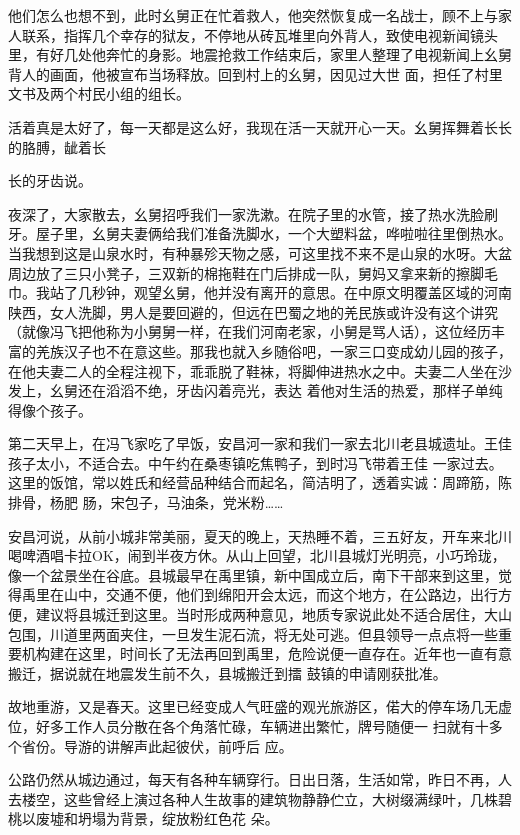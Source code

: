 \documentclass{article}
\begin{document}
他们怎么也想不到，此时幺舅正在忙着救人，他突然恢复成一名战士，顾不上与家人联系，指挥几个幸存的狱友，不停地从砖瓦堆里向外背人，致使电视新闻镜头里，有好几处他奔忙的身影。地震抢救工作结束后，家里人整理了电视新闻上幺舅背人的画面，他被宣布当场释放。回到村上的幺舅，因见过大世
面，担任了村里文书及两个村民小组的组长。 

活着真是太好了，每一天都是这么好，我现在活一天就开心一天。幺舅挥舞着长长的胳膊，龇着长

\newpage
长的牙齿说。 

夜深了，大家散去，幺舅招呼我们一家洗漱。在院子里的水管，接了热水洗脸刷牙。屋子里，幺舅夫妻俩给我们准备洗脚水，一个大塑料盆，哗啦啦往里倒热水。当我想到这是山泉水时，有种暴殄天物之感，可这里找不来不是山泉的水呀。大盆周边放了三只小凳子，三双新的棉拖鞋在门后排成一队，舅妈又拿来新的擦脚毛巾。我站了几秒钟，观望幺舅，他并没有离开的意思。在中原文明覆盖区域的河南陕西，女人洗脚，男人是要回避的，但远在巴蜀之地的羌民族或许没有这个讲究（就像冯飞把他称为小舅舅一样，在我们河南老家，小舅是骂人话），这位经历丰富的羌族汉子也不在意这些。那我也就入乡随俗吧，一家三口变成幼儿园的孩子，在他夫妻二人的全程注视下，乖乖脱了鞋袜，将脚伸进热水之中。夫妻二人坐在沙发上，幺舅还在滔滔不绝，牙齿闪着亮光，表达
着他对生活的热爱，那样子单纯得像个孩子。 

第二天早上，在冯飞家吃了早饭，安昌河一家和我们一家去北川老县城遗址。王佳孩子太小，不适合去。中午约在桑枣镇吃焦鸭子，到时冯飞带着王佳
\newpage
一家过去。这里的饭馆，常以姓氏和经营品种结合而起名，简洁明了，透着实诚：周蹄筋，陈排骨，杨肥
肠，宋包子，马油条，党米粉…… 

安昌河说，从前小城非常美丽，夏天的晚上，天热睡不着，三五好友，开车来北川喝啤酒唱卡拉OK，闹到半夜方休。从山上回望，北川县城灯光明亮，小巧玲珑，像一个盆景坐在谷底。县城最早在禹里镇，新中国成立后，南下干部来到这里，觉得禹里在山中，交通不便，他们到绵阳开会太远，而这个地方，在公路边，出行方便，建议将县城迁到这里。当时形成两种意见，地质专家说此处不适合居住，大山包围，川道里两面夹住，一旦发生泥石流，将无处可逃。但县领导一点点将一些重要机构建在这里，时间长了无法再回到禹里，危险说便一直存在。近年也一直有意搬迁，据说就在地震发生前不久，县城搬迁到擂
鼓镇的申请刚获批准。 

故地重游，又是春天。这里已经变成人气旺盛的观光旅游区，偌大的停车场几无虚位，好多工作人员分散在各个角落忙碌，车辆进出繁忙，牌号随便一
\newpage
扫就有十多个省份。导游的讲解声此起彼伏，前呼后
应。 

公路仍然从城边通过，每天有各种车辆穿行。日出日落，生活如常，昨日不再，人去楼空，这些曾经上演过各种人生故事的建筑物静静伫立，大树缀满绿叶，几株碧桃以废墟和坍塌为背景，绽放粉红色花
朵。 
\end{document}
